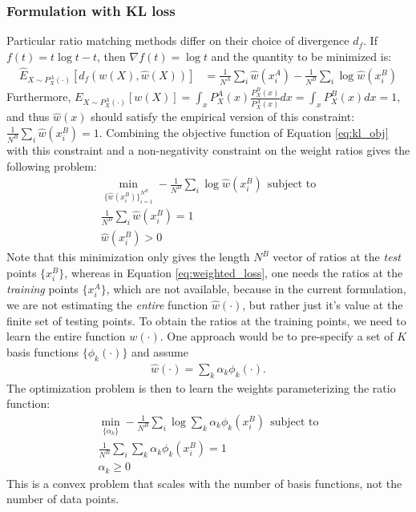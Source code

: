 \documentclass[8pt]{article}
\begin{document}
\subsubsection{Formulation with KL loss}
Particular ratio matching methods differ on their choice of divergence
$d_f$.  If $f(t)=t\log t - t$, then $\nabla f(t) =
\log t$ and the quantity to be minimized is:
\begin{align}
\hat{E}_{X\sim P_X^A(\cdot)}[d_f(w(X),\hat{w}(X))] &=\tfrac{1}{N^A}\sum_i\hat{w}(x_i^A) - \tfrac{1}{N^B}\sum_i\log \hat{w}(x_i^B)\label{eq:kl_obj}
\end{align}
Furthermore, $E_{X\sim P_X^A(\cdot)}[w(X)]=\int_x
P_X^A(x)\tfrac{P_X^B(x)}{P_X^A(x)}dx = \int_x P_X^B(x)dx=1$, and thus
$\hat{w}(x)$ should satisfy the empirical version of this constraint:
$\tfrac{1}{N^B}\sum_i \hat{w}(x_i^B)=1$.  Combining the objective
function of Equation \ref{eq:kl_obj} 
with this constraint and a
non-negativity constraint on the weight ratios gives the following
problem:
\begin{align}
\min_{\{\hat{w}(x_i^B)\}_{i=1}^{N^B}}  - \tfrac{1}{N^B}\sum_i\log
\hat{w}(x_i^B) \ \ \text{subject to}\\
\tfrac{1}{N^B}\sum_i \hat{w}(x_i^B)=1\\
\hat{w}(x_i^B) > 0
\end{align}
Note that this minimization only gives the length $N^B$ vector of ratios at the \emph{test}
points $\{x_i^B\}$, whereas in Equation \ref{eq:weighted_loss}, one
needs the ratios at the \emph{training} points $\{x_i^A\}$, which are
not available, because in the current formulation, we are not
estimating the \emph{entire} function $\hat{w}(\cdot)$, but rather
just it's value at the finite set of testing points.  To obtain the
ratios at the training points, we need to learn the entire function
$w(\cdot)$.  One approach would be to pre-specify a set of $K$ basis
functions $\{\phi_k(\cdot)\}$ and assume 
\begin{align}
\hat{w}(\cdot) = \sum_k\alpha_k \phi_k(\cdot). \label{eq:basis}
\end{align} 
The optimization problem is then to learn the weights
parameterizing the ratio function:
\begin{align}
\min_{\{\alpha_k\}}  - \tfrac{1}{N^B}\sum_i\log \sum_k
\alpha_k\phi_k(x_i^B)\label{eq:kl_obj} \ \ \text{subject to}\\
\tfrac{1}{N^B}\sum_i \sum_k \alpha_k\phi_k(x_i^B)=1\\
\alpha_k \geq 0
\end{align}
This is a convex problem that scales with the number of basis functions, not
the number of data points.
\end{document}

